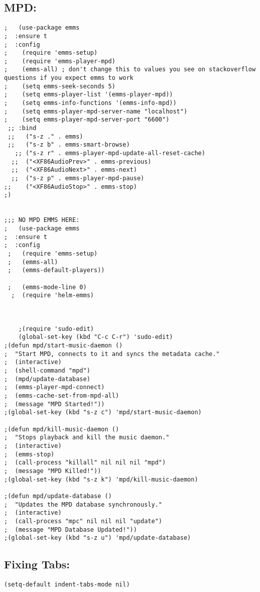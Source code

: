 \documentclass[11pt]{article}
\begin{document}
\subsection{MPD:}
\label{sec:org1a4fdc9}
\begin{verbatim}
;   (use-package emms
;  :ensure t
;  :config
;    (require 'emms-setup)
;    (require 'emms-player-mpd)
;    (emms-all) ; don't change this to values you see on stackoverflow questions if you expect emms to work
;    (setq emms-seek-seconds 5)
;    (setq emms-player-list '(emms-player-mpd))
;    (setq emms-info-functions '(emms-info-mpd))
;    (setq emms-player-mpd-server-name "localhost")
;    (setq emms-player-mpd-server-port "6600")
 ;; :bind
 ;;   ("s-z ." . emms)
 ;;   ("s-z b" . emms-smart-browse)
   ;; ("s-z r" . emms-player-mpd-update-all-reset-cache)
  ;;  ("<XF86AudioPrev>" . emms-previous)
  ;;  ("<XF86AudioNext>" . emms-next)
  ;;  ("s-z p" . emms-player-mpd-pause)
;;    ("<XF86AudioStop>" . emms-stop)
;)


;;; NO MPD EMMS HERE:
;   (use-package emms
;  :ensure t
;  :config
 ;   (require 'emms-setup)
 ;   (emms-all)
 ;   (emms-default-players))

 ;   (emms-mode-line 0)
  ;  (require 'helm-emms)



    ;(require 'sudo-edit)
    (global-set-key (kbd "C-c C-r") 'sudo-edit)
;(defun mpd/start-music-daemon ()
;  "Start MPD, connects to it and syncs the metadata cache."
;  (interactive)
;  (shell-command "mpd")
;  (mpd/update-database)
;  (emms-player-mpd-connect)
;  (emms-cache-set-from-mpd-all)
;  (message "MPD Started!"))
;(global-set-key (kbd "s-z c") 'mpd/start-music-daemon)

;(defun mpd/kill-music-daemon ()
;  "Stops playback and kill the music daemon."
;  (interactive)
;  (emms-stop)
;  (call-process "killall" nil nil nil "mpd")
;  (message "MPD Killed!"))
;(global-set-key (kbd "s-z k") 'mpd/kill-music-daemon)

;(defun mpd/update-database ()
;  "Updates the MPD database synchronously."
;  (interactive)
;  (call-process "mpc" nil nil nil "update")
;  (message "MPD Database Updated!"))
;(global-set-key (kbd "s-z u") 'mpd/update-database)
\end{verbatim}
\subsection{Fixing Tabs:}
\label{sec:org5cc4a21}
\begin{verbatim}
(setq-default indent-tabs-mode nil)
\end{verbatim}
\end{document}
